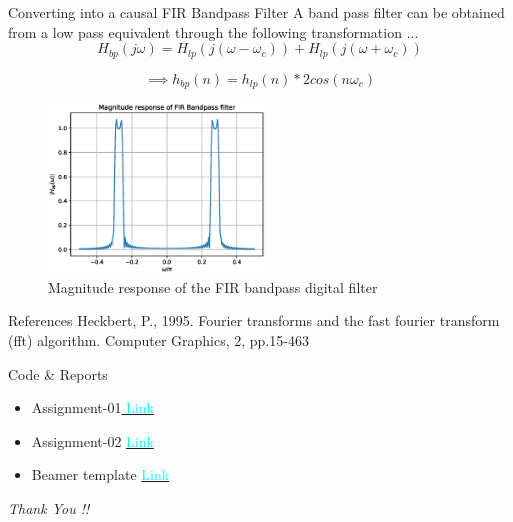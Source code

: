 \documentclass[notheorems]{beamer}
\begin{document}
\begin{frame}{ Converting into a causal FIR Bandpass Filter}
A band pass filter can be obtained from a low pass equivalent through the following transformation ...
\small
\begin{equation}
H_{bp}(j\omega) = H_{lp}(j(\omega - \omega_{c})) + H_{lp}(j(\omega + \omega_{c}))
\end{equation}

\begin{equation}
\implies h_{bp}(n) = h_{lp}(n)* 2cos(n\omega_c)
\end{equation}

\begin{figure}
\label{fig7}
\includegraphics[width = 5.75cm]{figs/FIR_bandpass.eps}
\caption{Magnitude response of the FIR bandpass digital filter } 
\end{figure}

\end{frame}

\begin{frame}

\begin{block}{References}
Heckbert, P., 1995. Fourier transforms and the fast fourier transform (fft) algorithm. Computer Graphics, 2, pp.15-463
\end{block}

\begin{block}{Code \& Reports}
\small
\begin{itemize}

\item Assignment-01\href{https://github.com/Surya291/ACADEMIA/tree/master/IDP_3_2/Asst_01}{\textcolor{cyan} { \; Link }}
\item Assignment-02 \href{https://github.com/Surya291/ACADEMIA/tree/master/IDP_3_2/Asst_02}{\textcolor{cyan} { \; Link }}

\item Beamer template \href{https://github.com/jakobbbb/cknopmpf}{\textcolor{cyan} { \; Link }}

\end{itemize}
\end{block}


  \centering \Huge
  \emph{Thank You !!}


\end{frame}
\end{document}
